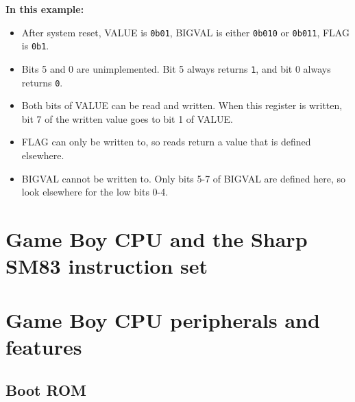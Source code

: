 \documentclass[a4paper, draft, oneside]{memoir}
\newcommand{\bit}[1]{\texttt{#1}}
\newcommand{\bin}[1]{\texttt{0b#1}}
\begin{document}
\begin{register}[H]
  \vspace{3mm}
  \textbf{In this example:}
  \begin{itemize}
    \item{After system reset, VALUE is \bin{01}, BIGVAL is either \bin{010} or \bin{011}, FLAG is \bin{1}.}
    \item{Bits 5 and 0 are unimplemented. Bit 5 always returns \bit{1}, and bit 0 always returns \bit{0}.}
    \item{Both bits of VALUE can be read and written. When this register is written, bit 7 of the written value goes to bit 1 of VALUE.}
    \item{FLAG can only be written to, so reads return a value that is defined elsewhere.}
    \item{BIGVAL cannot be written to. Only bits 5-7 of BIGVAL are defined here, so look elsewhere for the low bits 0-4.}
  \end{itemize}
\end{register}

\clearpage

\tableofcontents

\part{Game Boy CPU and the Sharp SM83 instruction set}



\part{Game Boy CPU peripherals and features}

\chapter{Boot ROM}
\end{document}
